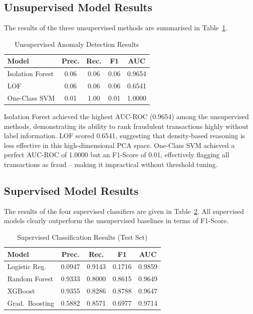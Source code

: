 \documentclass[conference]{IEEEtran}
\begin{document}
\subsection{Unsupervised Model Results}
The results of the three unsupervised methods are summarised in Table~\ref{tab:unsupervised}.

\begin{table}[h!]
\centering
\caption{Unsupervised Anomaly Detection Results}
\label{tab:unsupervised}
\setlength{\tabcolsep}{4pt}
\small
\begin{tabular}{lcccc}
\toprule
\textbf{Model} & \textbf{Prec.} & \textbf{Rec.} & \textbf{F1} & \textbf{AUC} \\
\midrule
Isolation Forest & 0.06 & 0.06 & 0.06 & 0.9654 \\
LOF              & 0.06 & 0.06 & 0.06 & 0.6541 \\
One-Class SVM    & 0.01 & 1.00 & 0.01 & 1.0000 \\
\bottomrule
\end{tabular}
\end{table}

Isolation Forest achieved the highest AUC-ROC (0.9654) among the unsupervised methods, demonstrating its ability to rank fraudulent transactions highly without label information. LOF scored 0.6541, suggesting that density-based reasoning is less effective in this high-dimensional PCA space. One-Class SVM achieved a perfect AUC-ROC of 1.0000 but an F1-Score of 0.01, effectively flagging all transactions as fraud -- making it impractical without threshold tuning.

\subsection{Supervised Model Results}
The results of the four supervised classifiers are given in Table~\ref{tab:supervised}. All supervised models clearly outperform the unsupervised baselines in terms of F1-Score.

\begin{table}[h!]
\centering
\caption{Supervised Classification Results (Test Set)}
\label{tab:supervised}
\setlength{\tabcolsep}{4pt}
\small
\begin{tabular}{lcccc}
\toprule
\textbf{Model} & \textbf{Prec.} & \textbf{Rec.} & \textbf{F1} & \textbf{AUC} \\
\midrule
Logistic Reg.   & 0.0947 & 0.9143 & 0.1716 & 0.9859 \\
Random Forest   & 0.9333 & 0.8000 & 0.8615 & 0.9649 \\
XGBoost         & 0.9355 & 0.8286 & 0.8788 & 0.9647 \\
Grad.\ Boosting & 0.5882 & 0.8571 & 0.6977 & 0.9714 \\
\bottomrule
\end{tabular}
\end{table}
\end{document}
